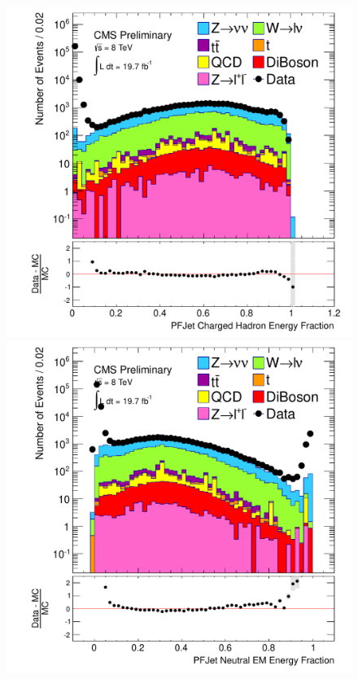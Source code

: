 \begin{figure}[!Hhtb]
\begin{center}
  \includegraphics[scale=0.31]     {Figures/sus13009/nocut/prelimLabels/PFAK5JetChaHadEngFrac.pdf}
  \includegraphics[scale=0.31]     {Figures/sus13009/nocut/prelimLabels/PFAK5JetNeuEmEngFrac.pdf}

\end{center}
\end{figure}
